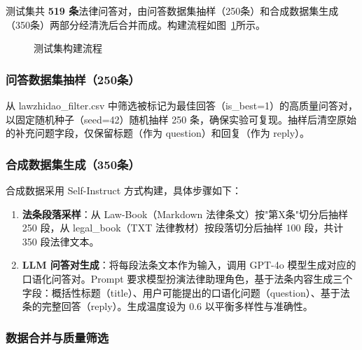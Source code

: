 \documentclass[12pt, a4paper]{article}
\begin{document}
测试集共 \textbf{519 条}法律问答对，由问答数据集抽样（250条）和合成数据集生成（350条）两部分经清洗后合并而成。构建流程如图~\ref{fig:testset_flow}所示。

\begin{figure}[H]
\centering
{}
\caption{测试集构建流程}
\label{fig:testset_flow}
\end{figure}

\subsubsection{问答数据集抽样（250条）}

从 lawzhidao\_filter.csv 中筛选被标记为最佳回答（is\_best=1）的高质量问答对，以固定随机种子（seed=42）随机抽样 250 条，确保实验可复现。抽样后清空原始的补充问题字段，仅保留标题（作为 question）和回复（作为 reply）。

\subsubsection{合成数据集生成（350条）}

合成数据采用 Self-Instruct 方式构建，具体步骤如下：

\begin{enumerate}[leftmargin=2em]
    \item \textbf{法条段落采样}：从 Law-Book（Markdown 法律条文）按"第X条"切分后抽样 250 段，从 legal\_book（TXT 法律教材）按段落切分后抽样 100 段，共计 350 段法律文本。

    \item \textbf{LLM 问答对生成}：将每段法条文本作为输入，调用 GPT-4o 模型生成对应的口语化问答对。Prompt 要求模型扮演法律助理角色，基于法条内容生成三个字段：概括性标题（title）、用户可能提出的口语化问题（question）、基于法条的完整回答（reply）。生成温度设为 0.6 以平衡多样性与准确性。
\end{enumerate}

\subsubsection{数据合并与质量筛选}
\end{document}
